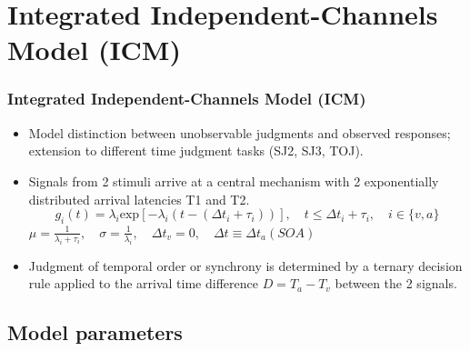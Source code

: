 \documentclass[xcolor={fixpdftex,hyperref,x11names},10pt,pdftex,hyperref={pdftex}]{beamer}
\begin{document}

\section{Integrated Independent-Channels Model (ICM)}
\label{sec:icm}

\begin{frame}
  \frametitle{Integrated Independent-Channels Model (ICM)}
  \begin{itemize}
   \item  Model distinction between unobservable judgments and
   observed responses; extension to different time judgment tasks (SJ2, SJ3, TOJ).  
   \item  Signals from 2 stimuli arrive at a central mechanism with 2
    exponentially distributed arrival latencies T1 and T2.
   \newline
  \begin{equation}
   g_i(t) = \lambda_i \text{exp}[-\lambda_i(t-(\Delta t_i + \tau_i ))],
   \quad t \leq \Delta t_i + \tau_i,\quad  i\in\{v,a\}
  \end{equation}
   \newline
   $\mu = \frac{1}{\lambda_i+\tau_i},\quad\sigma = \frac{1}{\lambda_i},
   \quad \Delta t_v=0, \quad\Delta t\equiv\Delta t_a (SOA) $
   \newline
   \item  Judgment of temporal order or synchrony is determined by
   a ternary decision rule applied to the arrival time
   difference $D=T_a-T_v$ between the 2 signals.
 \end{itemize}
\end{frame}

\subsection{Model parameters}
\end{document}
